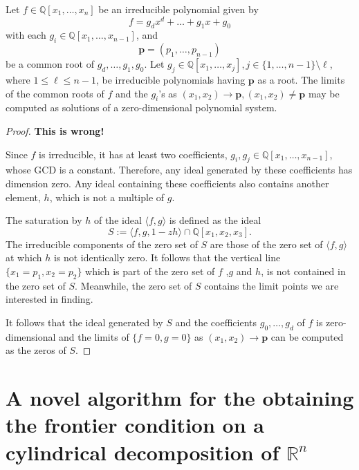 \documentclass[
]{book}
\theoremstyle{definition}
\theoremstyle{definition}
\theoremstyle{definition}
\theoremstyle{definition}
\theoremstyle{remark}
\begin{document}
Let \(f \in \mathbb{Q}[x_1,\ldots,x_n]\) be an irreducible polynomial given by
\[f = g_dx^d + \ldots + g_1x + g_0\]
with each \(g_i \in \mathbb{Q}[x_1,\ldots,x_{n-1}]\), and
\[\mathbf{p} = (p_1,\ldots,p_{n-1})\]
be a common root of \(g_d,\ldots,g_1,g_0\).
Let \(g_j\in \mathbb{Q}[x_1,\ldots,x_j], j \in \{1,\ldots,n-1\} \setminus \ell\), where \(1 \le \ell \le n-1\), be irreducible polynomials having \(\mathbf{p}\) as a root.
The limits of the common roots of \(f\) and the \(g_i\)'s as \((x_1, x_2) \to \mathbf{p}, (x_1, x_2) \ne \mathbf{p}\) may be computed as solutions of a zero-dimensional
polynomial system.

\begin{proof}
\textbf{This is wrong!}

Since \(f\) is irreducible, it has at least two coefficients, \(g_i,g_j \in \mathbb{Q}[x_1,\ldots,x_{n-1}]\), whose GCD is a constant.
Therefore, any ideal generated by these coefficients has dimension zero. Any ideal containing these coefficients also contains another element, \(h\), which is not a multiple of \(g\).

The saturation by \(h\) of the ideal \(\langle f,g \rangle\) is defined as the ideal
\[
S := \langle f, g, 1 - zh \rangle \cap \mathbb{Q}[x_1,x_2,x_3].
\]
The irreducible components of the zero set of \(S\) are those of the zero set of \(\langle f,g \rangle\) at which \(h\) is not identically zero. It follows that the vertical line \(\{ x_1 = p_1, x_2 = p_2 \}\) which is part of the zero set of \(f\) ,\(g\) and \(h\), is not contained in the zero set of \(S\). Meanwhile, the zero set of \(S\) contains the limit points we are interested in finding.

It follows that the ideal generated by \(S\) and the coefficients \(g_0,\ldots,g_d\) of \(f\) is zero-dimensional and the limits of \(\{ f=0,g=0 \}\) as \((x_1,x_2) \to \mathbf{p}\) can be computed as the zeros of \(S\).
\end{proof}

\hypertarget{a-novel-algorithm-for-the-obtaining-the-frontier-condition-on-a-cylindrical-decomposition-of-mathbbrn}{%
\chapter{\texorpdfstring{A novel algorithm for the obtaining the frontier condition on a cylindrical decomposition of \(\mathbb{R}^n\)}{A novel algorithm for the obtaining the frontier condition on a cylindrical decomposition of \textbackslash mathbb\{R\}\^{}n}}\label{a-novel-algorithm-for-the-obtaining-the-frontier-condition-on-a-cylindrical-decomposition-of-mathbbrn}}
\end{document}
